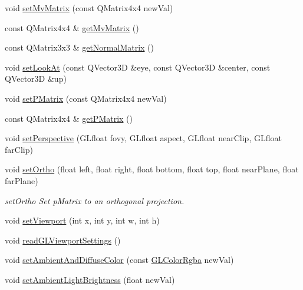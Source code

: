 \begin{DoxyCompactItemize}
\item 
void \mbox{\hyperlink{class_g_l_e_s_renderer_a8242d0b241a14c5850867ec00819c014}{set\+Mv\+Matrix}} (const Q\+Matrix4x4 new\+Val)
\item 
const Q\+Matrix4x4 \& \mbox{\hyperlink{class_g_l_e_s_renderer_af6f079ccbe2e37b90018dde13ad36b94}{get\+Mv\+Matrix}} ()
\item 
const Q\+Matrix3x3 \& \mbox{\hyperlink{class_g_l_e_s_renderer_a0dfc680c7a7b2aea8439f88a892858fe}{get\+Normal\+Matrix}} ()
\item 
void \mbox{\hyperlink{class_g_l_e_s_renderer_a180fe52b28553039f83b07157b962c3e}{set\+Look\+At}} (const Q\+Vector3D \&eye, const Q\+Vector3D \&center, const Q\+Vector3D \&up)
\item 
void \mbox{\hyperlink{class_g_l_e_s_renderer_ad439b83c368872dfd4439136d9af4d6d}{set\+P\+Matrix}} (const Q\+Matrix4x4 new\+Val)
\item 
const Q\+Matrix4x4 \& \mbox{\hyperlink{class_g_l_e_s_renderer_a57700c29516d33449e65e7243eaf2aac}{get\+P\+Matrix}} ()
\item 
void \mbox{\hyperlink{class_g_l_e_s_renderer_afff0eca251e49d50c83277a2fe3ad5af}{set\+Perspective}} (G\+Lfloat fovy, G\+Lfloat aspect, G\+Lfloat near\+Clip, G\+Lfloat far\+Clip)
\item 
void \mbox{\hyperlink{class_g_l_e_s_renderer_a7f0488a9867d384110718ca6ef9a70af}{set\+Ortho}} (float left, float right, float bottom, float top, float near\+Plane, float far\+Plane)
\begin{DoxyCompactList}\small\item\em set\+Ortho Set p\+Matrix to an orthogonal projection. \end{DoxyCompactList}\item 
void \mbox{\hyperlink{class_g_l_e_s_renderer_a9715cb674cb2fb4ae0cf13052f063336}{set\+Viewport}} (int x, int y, int w, int h)
\item 
void \mbox{\hyperlink{class_g_l_e_s_renderer_aadd9caa2f116226fa3d896bbad437e90}{read\+G\+L\+Viewport\+Settings}} ()
\item 
void \mbox{\hyperlink{class_g_l_e_s_renderer_afce69d0a59a823b4470037bd785d0694}{set\+Ambient\+And\+Diffuse\+Color}} (const \mbox{\hyperlink{class_g_l_color_rgba}{G\+L\+Color\+Rgba}} new\+Val)
\item 
void \mbox{\hyperlink{class_g_l_e_s_renderer_a0173737627f25d5a0586a57569c211d2}{set\+Ambient\+Light\+Brightness}} (float new\+Val)
\item 

\end{DoxyCompactItemize}
